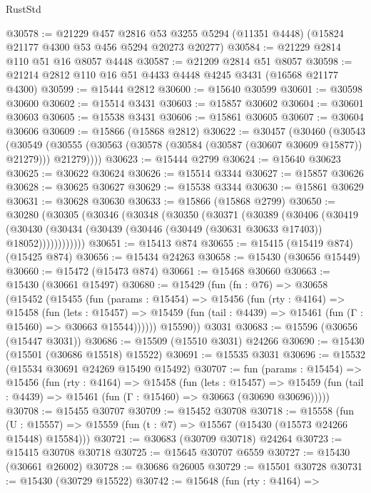 \begin{lexlean}{RustStd}
\begin{coremodule}
{\begin{coremodule}
{{{{{{{{{{{{{{{{{{{{{{{{{{{{{{{{{{{{{{{{{{{{{{{{{{{{{{{{{{{{@30578 := @21229
    @457
    @2816
    @53
    @3255
    @5294
    (@11351 @4448)
    (@15824 @21177 @4300 @53 @456 @5294 @20273 @20277)
@30584 := @21229 @2814 @110 @51 @16 @8057 @4448
@30587 := @21209 @2814 @51 @8057
@30598 := @21214 @2812 @110 @16 @51 @4433 @4448 @4245 @3431 (@16568 @21177 @4300)
@30599 := @15444 @2812
@30600 := @15640 @30599
@30601 := @30598 @30600
@30602 := @15514 @3431
@30603 := @15857 @30602
@30604 := @30601 @30603
@30605 := @15538 @3431
@30606 := @15861 @30605
@30607 := @30604 @30606
@30609 := @15866 (@15868 @2812)
@30622 := @30457
    (@30460
      (@30543
        (@30549 (@30555 (@30563 (@30578 (@30584 (@30587 (@30607 @30609 @15877)) @21279))) @21279))))
@30623 := @15444 @2799
@30624 := @15640 @30623
@30625 := @30622 @30624
@30626 := @15514 @3344
@30627 := @15857 @30626
@30628 := @30625 @30627
@30629 := @15538 @3344
@30630 := @15861 @30629
@30631 := @30628 @30630
@30633 := @15866 (@15868 @2799)
@30650 := @30280
    (@30305
      (@30346
        (@30348
          (@30350
            (@30371
              (@30389
                (@30406
                  (@30419
                    (@30430
                      (@30434 (@30439 (@30446 (@30449 (@30631 @30633 @17403)) @18052))))))))))))
@30651 := @15413 @874
@30655 := @15415 (@15419 @874) (@15425 @874)
@30656 := @15434 @24263
@30658 := @15430 (@30656 @15449)
@30660 := @15472 (@15473 @874)
@30661 := @15468 @30660
@30663 := @15430 (@30661 @15497)
@30680 := @15429
    (fun (fn : @76) =>
    @30658
      (@15452
        (@15455
          (fun (params : @15454) =>
          @15456
            (fun (rty : @4164) =>
            @15458
              (fun (lets : @15457) =>
              @15459 (fun (tail : @4439) => @15461 (fun (Γ : @15460) => @30663 @15544))))))
        @15590))
    @3031
@30683 := @15596 (@30656 (@15447 @3031))
@30686 := @15509 (@15510 @3031) @24266
@30690 := @15430 (@15501 (@30686 @15518) @15522)
@30691 := @15535 @3031
@30696 := @15532 (@15534 @30691 @24269 @15490 @15492)
@30707 := fun (params : @15454) =>
  @15456
    (fun (rty : @4164) =>
    @15458
      (fun (lets : @15457) =>
      @15459 (fun (tail : @4439) => @15461 (fun (Γ : @15460) => @30663 (@30690 @30696)))))
@30708 := @15455 @30707
@30709 := @15452 @30708
@30718 := @15558
    (fun (U : @15557) => @15559 (fun (t : @7) => @15567 (@15430 (@15573 @24266 @15448) @15584)))
@30721 := @30683 (@30709 @30718) @24264
@30723 := @15415 @30708 @30718
@30725 := @15645 @30707 @6559
@30727 := @15430 (@30661 @26002)
@30728 := @30686 @26005
@30729 := @15501 @30728
@30731 := @15430 (@30729 @15522)
@30742 := @15648
    (fun (rty : @4164) =>
}}}}}}}}}}}}}}}}}}}}}}}}}}}}}}}}}}}}}}}}}}}}}}}}}}}}}}}}}}}}
\end{coremodule}}
\end{coremodule}
\end{lexlean}

